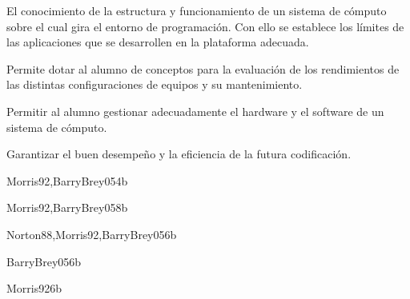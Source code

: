 \begin{syllabus}


\begin{justification}
El conocimiento de la estructura y funcionamiento de un sistema de cómputo sobre el cual gira el entorno de programación. Con ello se establece los límites de las aplicaciones que se desarrollen en la plataforma adecuada.

Permite dotar al alumno de conceptos para la evaluación de los rendimientos de las distintas configuraciones de equipos y su mantenimiento.
\end{justification}

\begin{goals}
\item Permitir al alumno gestionar adecuadamente el hardware y el software de un sistema de cómputo.
\item Garantizar el buen desempeño y la eficiencia de la futura codificación.
\end{goals}


\begin{unit}{\ARDigitalLogicAndDataRepresentationDef}{}{Morris92,BarryBrey05}{4}{b}
   \ARDigitalLogicAndDataRepresentationAllTopics
   \ARDigitalLogicAndDataRepresentationAllObjectives
\end{unit}

\begin{unit}{\ARComputerArchitectureOrganizationDef}{}{Morris92,BarryBrey05}{8}{b}
   \ARComputerArchitectureOrganizationAllTopics
    \ARComputerArchitectureOrganizationAllObjectives
\end{unit}

\begin{unit}{\ARMemoryArchitectureDef}{}{Norton88,Morris92,BarryBrey05}{6}{b}
    \ARMemoryArchitectureAllTopics
    \ARMemoryArchitectureAllObjectives
\end{unit}

\begin{unit}{\ARInterfacingAndIOStrategiesDef}{}{BarryBrey05}{6}{b}
    \ARInterfacingAndIOStrategiesAllTopics
    \ARInterfacingAndIOStrategiesAllObjectives
\end{unit}

\begin{unit}{\ARFunctionalOrganizationDef}{}{Morris92}{6}{b}
    \ARFunctionalOrganizationAllTopics
    \ARFunctionalOrganizationAllObjectives
\end{unit}


\end{syllabus}
